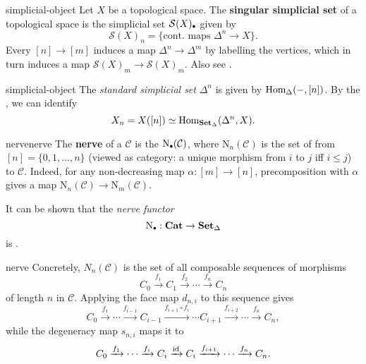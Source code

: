 \begin{example}{simplicial-object}
    Let $X$ be a topological space. The \textbf{singular simplicial set} of a topological space is the simplicial set $\mathcal{S}(X)_\bdot$ given by
    \[ \mathcal{S}(X)_n = \{ \text{cont. maps } \Delta^n \to X \} . \]
    Every $[n] \to [m]$ induces a map $\Delta^n \to \Delta^m$ by labelling the vertices, which in turn induces a map $\mathcal{S}(X)_m \to \mathcal{S}(X)_m$. Also see .
\end{example}

\begin{example}{simplicial-object}
    The \textit{standard simplicial set} $\Delta^n$ is given by $\text{Hom}_\Delta(-, [n])$. By the , we can identify
    \[ X_n = X([n]) \simeq \text{Hom}_{\textbf{Set}_\Delta}(\Delta^n, X) . \]
\end{example}

\begin{topic}{nerve}{nerve}
    The \textbf{nerve} of a  $\mathcal{C}$ is the  $\text{N}_\bdot(\mathcal{C})$, where $\text{N}_n(\mathcal{C})$ is the set of  from $[n] = \{ 0, 1, \ldots, n \}$ (viewed as category: a unique morphism from $i$ to $j$ iff $i \le j$) to $\mathcal{C}$.
    Indeed, for any non-decreasing map $\alpha : [m] \to [n]$, precomposition with $\alpha$ gives a map $\text{N}_n(\mathcal{C}) \to \text{N}_m(\mathcal{C})$.
    
    It can be shown that the \textit{nerve functor}
    \[ \text{N}_\bdot : \textbf{Cat} \to \textbf{Set}_\Delta \]
    is  .
\end{topic}

\begin{example}{nerve}
    Concretely, $N_n(\mathcal{C})$ is the set of all composable sequences of morphisms
    \[ C_0 \xrightarrow{f_1} C_1 \xrightarrow{f_2} \cdots \xrightarrow{f_n} C_n \]
    of length $n$ in $\mathcal{C}$. Applying the face map $d_{n, i}$ to this sequence gives
    \[ C_0 \xrightarrow{f_1} \cdots \xrightarrow{f_{i - 1}} C_{i - 1} \xrightarrow{f_{i + 1} \circ f_i} \cdots C_{i + 1} \xrightarrow{f_{i + 2}} \cdots \xrightarrow{f_n} C_n , \]
    while the degeneracy map $s_{n, i}$ maps it to
    \[ C_0 \xrightarrow{f_1} \cdots \xrightarrow{f_i} C_i \xrightarrow{\text{id}} C_i \xrightarrow{f_{i + 1}} \cdots \xrightarrow{f_n} C_n . \]
\end{example}

